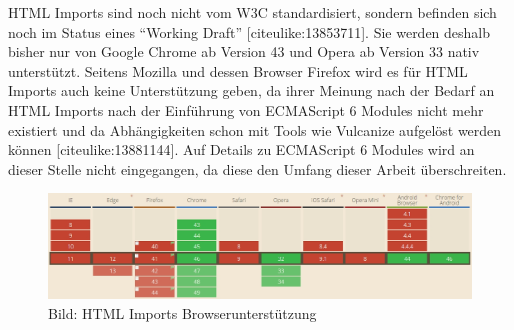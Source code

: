 HTML Imports sind noch nicht vom W3C standardisiert, sondern befinden
sich noch im Status eines ``Working Draft'' {[}citeulike:13853711{]}.
Sie werden deshalb bisher nur von Google Chrome ab Version 43 und Opera
ab Version 33 nativ unterstützt. Seitens Mozilla und dessen Browser
Firefox wird es für HTML Imports auch keine Unterstützung geben, da
ihrer Meinung nach der Bedarf an HTML Imports nach der Einführung von
ECMAScript 6 Modules nicht mehr existiert und da Abhängigkeiten schon
mit Tools wie Vulcanize aufgelöst werden können
{[}citeulike:13881144{]}. Auf Details zu ECMAScript 6 Modules wird an
dieser Stelle nicht eingegangen, da diese den Umfang dieser Arbeit
überschreiten.

\begin{figure}[htbp]
\centering
\includegraphics{images/5-html-imports-browserunterstuetzung.jpg}
\caption{Bild: HTML Imports Browserunterstützung}
\end{figure}
